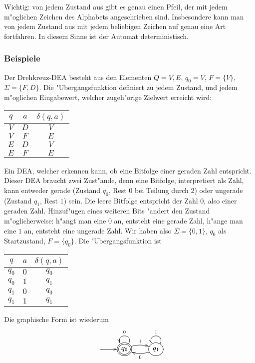 Wichtig: von jedem Zustand aus gibt es genau einen Pfeil, der mit jedem m"oglichen
Zeichen des Alphabets angeschrieben sind. Insbesondere kann man von jedem
Zustand aus mit jedem beliebigen Zeichen auf genau eine Art fortfahren.
In diesem Sinne ist der Automat deterministisch.

\subsubsection{Beispiele}
\begin{beispiel}[\bf Drehkreuz]
Der Drehkreuz-DEA besteht aus den Elementen $Q={V,E}$, $q_0=V$,
$F=\{V\}$, $\Sigma=\{F,D\}$.
Die "Ubergangsfunktion definiert zu jedem Zustand, und jedem m"oglichen
Eingabewert, welcher zugeh"orige Zielwert erreicht wird:
\begin{center}
\begin{tabular}{|cc|c|}
\hline
$q$&$a$&$\delta(q,a)$\\
\hline
$V$&$D$&$V$\\
$V$&$F$&$E$\\
$E$&$D$&$V$\\
$E$&$F$&$E$\\
\hline
\end{tabular}
\end{center}
\end{beispiel}
\begin{beispiel}
Ein DEA, welcher erkennen kann, ob eine Bitfolge einer geraden Zahl entspricht.
Dieser DEA braucht zwei Zust"ande, denn eine Bitfolge, interpretiert
als Zahl, kann entweder gerade (Zustand $q_0$, Rest $0$ bei Teilung durch 2)
oder ungerade (Zustand $q_1$, Rest $1$) sein. Die leere
Bitfolge entspricht der Zahl $0$, also einer geraden Zahl.
Hinzuf"ugen eines weiteren
Bits "andert den Zustand m"oglicherweise: h"angt man eine $0$ an, entsteht
eine gerade Zahl, h"ange man eine $1$ an, entsteht eine ungerade Zahl.
Wir haben also $\Sigma=\{0,1\}$, $q_0$ als Startzustand,  $F=\{q_0\}$. Die
"Ubergangsfunktion ist
\begin{center}
\begin{tabular}{|cc|c|}
\hline
$q$&$a$&$\delta(q,a)$\\
\hline
$q_0$&$0$&$q_0$\\
$q_0$&$1$&$q_1$\\
$q_1$&$0$&$q_0$\\
$q_1$&$1$&$q_1$\\
\hline
\end{tabular}
\end{center}
Die graphische Form ist wiederum
\[
\entrymodifiers={++[o][F]}
\xymatrix{
*+\txt{}\ar[r]
	&*++[o][F=]{q_0} \ar@/^/[r]^1 \ar@(ur,ul)_0
		&{q_1} \ar@/^/[l]^0 \ar@(ur,ul)_1
}
\]
\end{beispiel}
